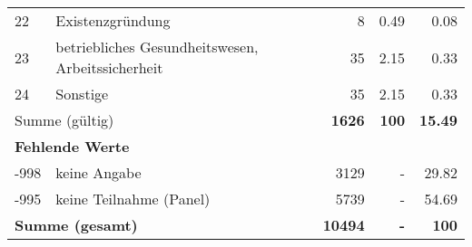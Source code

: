 \begin{longtable}{lXrrr}
        22 & \multicolumn{1}{X}{Existenzgründung} & %
          \num{8} &
          \num[round-mode=places,round-precision=2]{0,49} &
          \num[round-mode=places,round-precision=2]{0,08} \\

        23 & \multicolumn{1}{X}{betriebliches Gesundheitswesen, Arbeitssicherheit} & %
          \num{35} &
          \num[round-mode=places,round-precision=2]{2,15} &
          \num[round-mode=places,round-precision=2]{0,33} \\

        24 & \multicolumn{1}{X}{Sonstige} & %
          \num{35} &
          \num[round-mode=places,round-precision=2]{2,15} &
          \num[round-mode=places,round-precision=2]{0,33} \\

     \midrule
     \multicolumn{2}{l}{Summe (gültig)} &
       \textbf{\num{1626}} &
     \textbf{100} &
       \textbf{\num[round-mode=places,round-precision=2]{15,49}} \\
     \multicolumn{5}{l}{\textbf{Fehlende Werte}}\\
       -998 &
       keine Angabe &
         \num{3129} &
        - &
         \num[round-mode=places,round-precision=2]{29,82} \\
       -995 &
       keine Teilnahme (Panel) &
         \num{5739} &
        - &
         \num[round-mode=places,round-precision=2]{54,69} \\
     \midrule
     \multicolumn{2}{l}{\textbf{Summe (gesamt)}} &
          \textbf{\num{10494}} &
        \textbf{-} &
        \textbf{100} \\
     \bottomrule
     \end{longtable}
     
